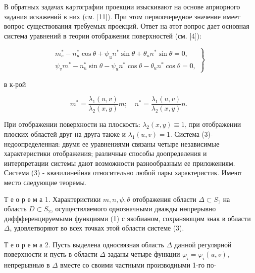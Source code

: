 \documentclass[10pt]{article}
\begin{document}
В обратных задачах картографии проекции изыскивают на основе априорного задания искажений в них (см. [11]). При этом первоочередное значение имеет вопрос существования требуемых проекций. Ответ на әтот вопрос дает основная система уравнений в теории отображения поверхностей (см. [4]):



\[

\left.\begin{array}{l}

m_{v}^{*}-n_{u}^{*} \cos \theta+\psi_{u} n^{*} \sin \theta+\theta_{u} n^{*} \sin \theta=0, \\

\psi_{v} m^{*}-n_{u}^{*} \sin \theta-\psi_{u} n^{*} \cos \theta-\theta_{u} n^{*} \cos \theta=0,

\end{array}\right\}

\]



в к-рой



\[

m^{*}=\frac{\lambda_{1}(u, v)}{\lambda_{2}(x, y)} m ; \quad n^{*}=\frac{\lambda_{1}(u, v)}{\lambda_{2}(x, y)} n .

\]



При отображении поверхности на плоскость: $\lambda_{2}(x, y) \equiv 1$, при отображении плоских областей друг на друга также и $\lambda_{1}(u, v)=1$. Система (3)- недоопределенная: двумя ее уравнениями связаны четыре независимые характеристики отображения; различные способы доопределения и интерпретации системы дают возможности разнообразным ее приложениям. Система (3) - квазилинейная относительно любой пары характеристик. Имеют место следующие теоремы.



Т е о р е м а 1. Характеристики $m, n, \psi, \theta$ отображения области $\Delta \subset S_{1}$ на область $D \subset S_{2}$, осуществляемого однозначными дважды нөпрерывно диффференцируемыми функциями (1) с якобианом, сохраняющим знак в области $\Delta$, удовлетворяют во всех точках этой области системе (3).



Т е о р е м а 2. Пусть выделена односвязная область $\Delta$ данной регулярной поверхности и пусть в области $\Delta$ заданы четыре функции $\varphi_{i}=\varphi_{i}(u, v)$, непрерывныө в $\Delta$ вместе со своими частными производными 1-го по-
\end{document}
